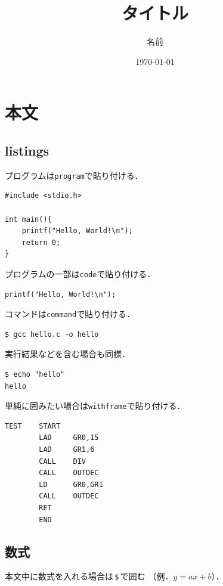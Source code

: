 \documentclass[uplatex]{jsarticle}
\newcommand{\vsc}{\vspace{5pt}}
\newcommand{\vsp}{\vspace{10pt}}
\begin{document}
\title{タイトル}
\author{名前}
\date{\today}
\maketitle
\tableofcontents

\newpage
\section{本文}
\subsection{listings}
プログラムは\verb|program|で貼り付ける．

\begin{lstlisting}[style=program,caption=hello.c]
#include <stdio.h>

int main(){
    printf("Hello, World!\n");
    return 0;
}
\end{lstlisting}
\vsp

プログラムの一部は\verb|code|で貼り付ける．

\vsc
\begin{lstlisting}[style=code]
printf("Hello, World!\n");
\end{lstlisting}

コマンドは\verb|command|で貼り付ける．

\vsc
\begin{lstlisting}[style=command]
$ gcc hello.c -o hello
\end{lstlisting}

実行結果などを含む場合も同様．

\vsc
\begin{lstlisting}[style=command]
$ echo "hello"
hello
\end{lstlisting}

単純に囲みたい場合は\verb|withframe|で貼り付ける．

\vsc
\begin{lstlisting}[style=withframe]
TEST    START
        LAD     GR0,15
        LAD     GR1,6
        CALL    DIV
        CALL    OUTDEC
        LD      GR0,GR1
        CALL    OUTDEC
        RET
        END
\end{lstlisting}

\newpage
\subsection{数式}
本文中に数式を入れる場合は\,\verb|$|\,で囲む
（例．$y=ax+b$）．
\end{document}
